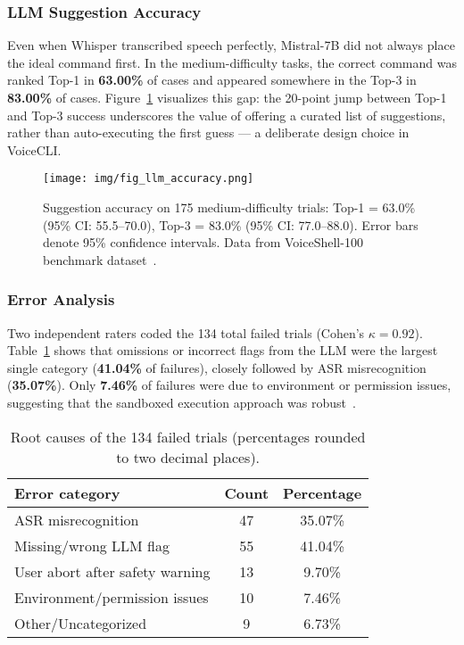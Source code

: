 \documentclass[a4paper,12pt]{article}
\begin{document}
\subsubsection{LLM Suggestion Accuracy}
Even when Whisper transcribed speech perfectly, Mistral-7B did not always place the ideal command first. In the medium-difficulty tasks, the correct command was ranked Top-1 in \textbf{63.00\%} of cases and appeared somewhere in the Top-3 in \textbf{83.00\%} of cases. Figure~\ref{fig:suggestionaccuracy} visualizes this gap: the 20-point jump between Top-1 and Top-3 success underscores the value of offering a curated list of suggestions, rather than auto-executing the first guess — a deliberate design choice in VoiceCLI.

\begin{figure}[H]
\centering
\texttt{[image: img/fig\_llm\_accuracy.png]}
\caption{Suggestion accuracy on 175 medium-difficulty trials: Top-1 = 63.0\% (95\% CI: 55.5–70.0), Top-3 = 83.0\% (95\% CI: 77.0–88.0). Error bars denote 95\% confidence intervals. Data from VoiceShell-100 benchmark dataset~\cite{ref26,ref27}.}
\label{fig:suggestionaccuracy}
\end{figure}

\subsubsection{Error Analysis}
Two independent raters coded the 134 total failed trials (Cohen's $\kappa = 0.92$). Table~\ref{tab:fail-causes} shows that omissions or incorrect flags from the LLM were the largest single category (\textbf{41.04\%} of failures), closely followed by ASR misrecognition (\textbf{35.07\%}). Only \textbf{7.46\%} of failures were due to environment or permission issues, suggesting that the sandboxed execution approach was robust~\cite{ref4,ref12}.


\begin{table}[h!]
\centering
\begin{tabular}{lcc}
\toprule
\textbf{Error category} & \textbf{Count} & \textbf{Percentage} \\
\midrule
ASR misrecognition           & 47 & 35.07\% \\
Missing/wrong LLM flag       & 55 & 41.04\% \\
User abort after safety warning & 13 & 9.70\% \\
Environment/permission issues & 10 & 7.46\% \\
Other/Uncategorized          & 9 & 6.73\% \\
\bottomrule
\end{tabular}
\caption{Root causes of the 134 failed trials (percentages rounded to two decimal places).}
\label{tab:fail-causes}
\end{table}
\end{document}
